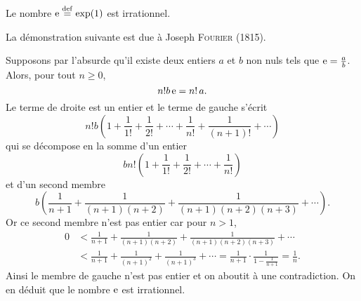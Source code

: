 \begin{prop}{}
    Le nombre $\mathrm{e} \overset{\mathrm{\tiny def}}{=} \exp(1)$ est irrationnel.
\end{prop}
La démonstration suivante est due à Joseph \textsc{Fourier} (1815).
\begin{preuve}
    Supposons par l'absurde qu'il existe deux entiers $a$ et $b$ non nuls tels que $\mathrm{e} = \frac{a}{b}$. Alors, pour tout $n \geqslant 0$,
    $$n! b\, \mathrm{e} = n!\, a.$$
    Le terme de droite est un entier et le terme de gauche s'écrit \note {}
    $$n! b \left(1 + \frac{1}{1!} + \frac{1}{2!} + \cdots + \frac{1}{n!} + \frac{1}{(n+1)!} + \cdots \right)$$
    qui se décompose en la somme d'un entier
    $$b n! \left(1 + \frac{1}{1!} + \frac{1}{2!} + \cdots + \frac{1}{n!} \right)$$
    et d'un second membre
    $$b \left( \frac{1}{n+1} + \frac{1}{(n+1)(n+2)} + \frac{1}{(n+1)(n+2)(n+3)}+ \cdots \right).$$
    Or ce second membre n'est pas entier car pour $n > 1$,
    \begin{align*}
        0 &< \frac{1}{n+1} + \frac{1}{(n+1)(n+2)} + \frac{1}{(n+1)(n+2)(n+3)} + \cdots \\
        & < \frac{1}{n+1} + \frac{1}{(n+1)^2} + \frac{1}{(n+1)^3} + \cdots = \frac{1}{n+1} \cdot \frac{1}{1-\frac{1}{n+1}} = \frac{1}{n}.
    \end{align*}
    Ainsi le membre de gauche n'est pas entier et on aboutit à une contradiction. On en déduit que le nombre $\mathrm{e}$ est irrationnel.
\end{preuve}

